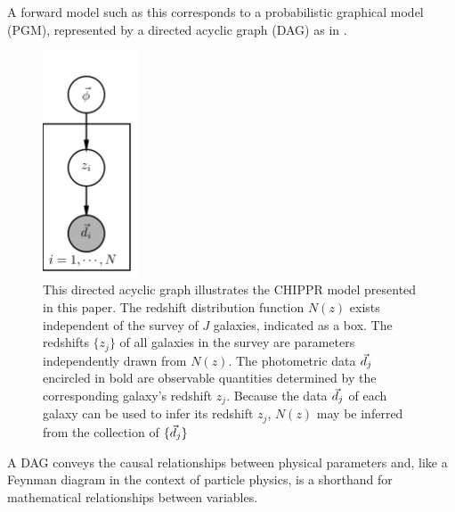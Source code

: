A forward model such as this corresponds to a probabilistic graphical model (PGM), represented by a directed acyclic graph (DAG) as in .
\begin{figure}
	\begin{center}
		\includegraphics[width=0.25\textwidth]{figures/chippr/pgm.png}
		\caption{This directed acyclic graph illustrates the CHIPPR model presented in this paper.  
			The redshift distribution function $N(z)$ exists independent of the survey of $J$ galaxies, indicated as a box.  
			The redshifts $\{z_{j}\}$ of all galaxies in the survey are parameters independently drawn from $N(z)$. 
			The photometric data $\vec{d}_{j}$ encircled in bold are observable quantities determined by the corresponding galaxy's redshift $z_{j}$.  
			Because the data $\vec{d}_{j}$ of each galaxy can be used to infer its redshift $z_{j}$, $N(z)$ may be inferred from the collection of $\{\vec{d}_{j}\}$}
	\end{center}
\end{figure}
A DAG conveys the causal relationships between physical parameters and, like a Feynman diagram in the context of particle physics, is a shorthand for mathematical relationships between variables.

